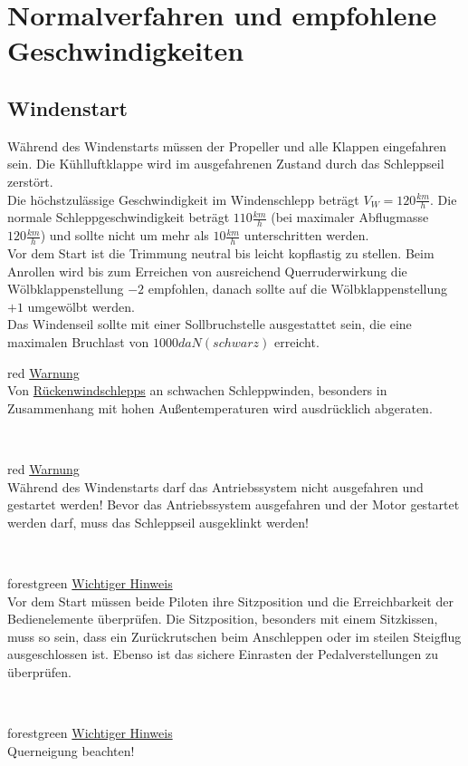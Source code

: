 \section{Normalverfahren und empfohlene Geschwindigkeiten}

\subsection{Windenstart}
Während des Windenstarts müssen der Propeller und alle Klappen eingefahren sein. Die Kühlluftklappe wird im ausgefahrenen Zustand durch das Schleppseil zerstört.\\

Die höchstzulässige Geschwindigkeit im Windenschlepp beträgt $V_W=120 \frac{km}{h}$. Die normale Schleppgeschwindigkeit beträgt $110 \frac{km}{h}$ (bei maximaler Abflugmasse $120 \frac{km}{h}$) und sollte nicht um mehr als $10 \frac{km}{h}$ unterschritten werden.\\
Vor dem Start ist die Trimmung neutral bis leicht kopflastig zu stellen. Beim Anrollen wird bis zum Erreichen von ausreichend Querruderwirkung die Wölbklappenstellung $-2$ empfohlen, danach sollte auf die Wölbklappenstellung $+1$ umgewölbt werden.\\
Das Windenseil sollte mit einer Sollbruchstelle ausgestattet sein, die eine maximalen Bruchlast von $1000 daN (schwarz)$ erreicht. \\
\newline
\begin{color}{red}
\large{\underline{Warnung}}\\
Von \underline{Rückenwindschlepps} an schwachen Schleppwinden, besonders in Zusammenhang mit hohen Außentemperaturen wird ausdrücklich abgeraten.
\end{color}\\
\newline
\begin{color}{red}
\large{\underline{Warnung}}\\
Während des Windenstarts darf das Antriebssystem nicht ausgefahren und gestartet werden! Bevor das Antriebssystem ausgefahren und der Motor gestartet werden darf, muss das Schleppseil ausgeklinkt werden!
\end{color}\\
\newline
\begin{color}{forestgreen}
\large{\underline{Wichtiger Hinweis}}\\
Vor dem Start müssen beide Piloten ihre Sitzposition und die Erreichbarkeit der 	Bedienelemente überprüfen. Die Sitzposition, besonders mit einem Sitzkissen, muss so sein, dass ein Zurückrutschen beim Anschleppen oder im steilen Steigflug ausgeschlossen ist. Ebenso ist das sichere Einrasten der Pedalverstellungen zu 	überprüfen.
\end{color}\\
\newline
\begin{color}{forestgreen}
\large{\underline{Wichtiger Hinweis}}\\
Querneigung beachten!
\end{color}\\
